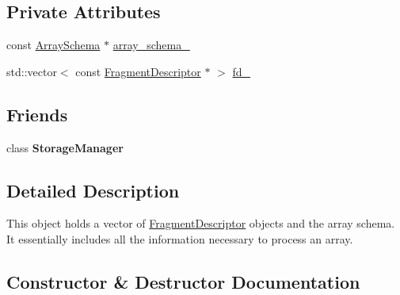 \subsection*{Private Attributes}
\begin{DoxyCompactItemize}
\item 
const \hyperlink{classArraySchema}{Array\+Schema} $\ast$ \hyperlink{classStorageManager_1_1ArrayDescriptor_afd309e397b152f51ffcae1841f8968c2}{array\+\_\+schema\+\_\+}
\item 
std\+::vector$<$ const \hyperlink{classStorageManager_1_1FragmentDescriptor}{Fragment\+Descriptor} $\ast$ $>$ \hyperlink{classStorageManager_1_1ArrayDescriptor_a3206c40ef7a620fe2cbdd49a99f51a03}{fd\+\_\+}
\end{DoxyCompactItemize}
\subsection*{Friends}
\begin{DoxyCompactItemize}
\item 
\hypertarget{classStorageManager_1_1ArrayDescriptor_aab928c97ba2ed82b71fb011b1c4fef74}{}class {\bfseries Storage\+Manager}\label{classStorageManager_1_1ArrayDescriptor_aab928c97ba2ed82b71fb011b1c4fef74}

\end{DoxyCompactItemize}


\subsection{Detailed Description}
This object holds a vector of \hyperlink{classStorageManager_1_1FragmentDescriptor}{Fragment\+Descriptor} objects and the array schema. It essentially includes all the information necessary to process an array. 

\subsection{Constructor \& Destructor Documentation}
\hypertarget{classStorageManager_1_1ArrayDescriptor_aecb73f50ff75e8bfba047b8350a14a21}{}
